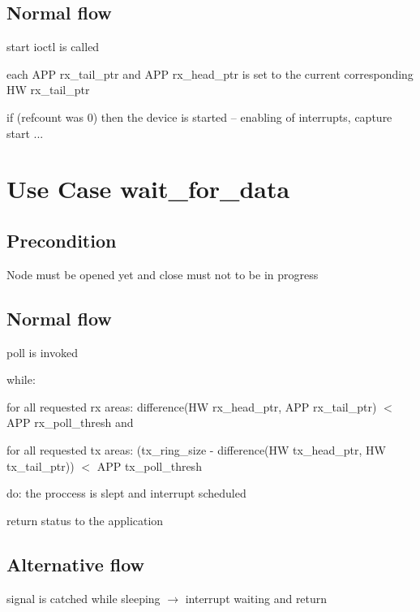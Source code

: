   \subsection{Normal flow}
  \begin{CompactEnumerate}
    \item start ioctl is called
    \item each APP rx\_tail\_ptr and APP rx\_head\_ptr is set to the current
      corresponding HW rx\_tail\_ptr
    \item if (refcount was 0) then the device is started -- enabling of
      interrupts, capture start ...
  \end{CompactEnumerate}

  \section{Use Case wait\_for\_data}

  \subsection{Precondition}
  Node must be opened yet and close must not to be in progress

  \subsection{Normal flow}
  \begin{CompactEnumerate}
    \item poll is invoked
    \item while:
    \begin{CompactEnumerate}
      \item for all requested rx areas: difference(HW rx\_head\_ptr, APP
        rx\_tail\_ptr) $<$ APP rx\_poll\_thresh and
      \item for all requested tx areas: (tx\_ring\_size - difference(HW
        tx\_head\_ptr, HW tx\_tail\_ptr)) $<$ APP tx\_poll\_thresh
    \end{CompactEnumerate}
      do: the proccess is slept and interrupt scheduled
    \item return status to the application
  \end{CompactEnumerate}

  \subsection{Alternative flow}
  \begin{CompactItemize}
    \item signal is catched while sleeping $\rightarrow$ interrupt waiting and
      return
  \end{CompactItemize}

